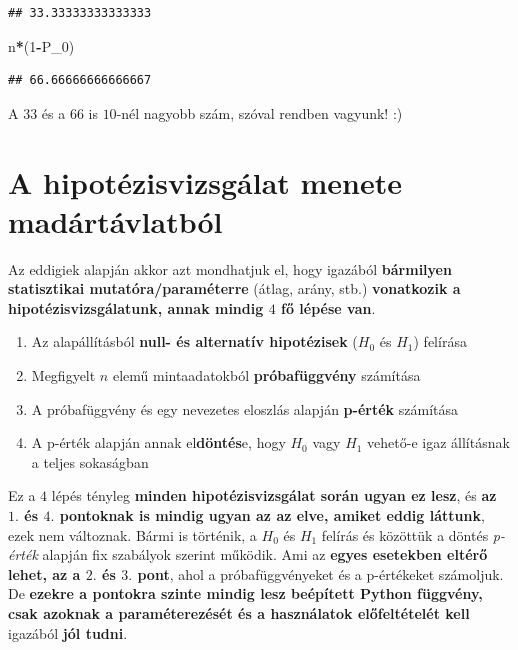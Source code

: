 \documentclass[
]{book}
\newenvironment{Shaded}{\begin{snugshade}}{\end{snugshade}}
\newcommand{\DecValTok}[1]{\textcolor[rgb]{0.00,0.00,0.81}{#1}}
\newcommand{\NormalTok}[1]{#1}
\newcommand{\OperatorTok}[1]{\textcolor[rgb]{0.81,0.36,0.00}{\textbf{#1}}}
\providecommand{\tightlist}{%
  \setlength{\itemsep}{0pt}\setlength{\parskip}{0pt}}
\begin{document}
\begin{verbatim}
## 33.33333333333333
\end{verbatim}

\begin{Shaded}
\begin{Highlighting}[]
\NormalTok{n}\OperatorTok{*}\NormalTok{(}\DecValTok{1}\OperatorTok{{-}}\NormalTok{P\_0)}
\end{Highlighting}
\end{Shaded}

\begin{verbatim}
## 66.66666666666667
\end{verbatim}

A \(33\) és a \(66\) is \(10\)-nél nagyobb szám, szóval rendben vagyunk! :)

\section{A hipotézisvizsgálat menete madártávlatból}\label{a-hipotuxe9zisvizsguxe1lat-menete-maduxe1rtuxe1vlatbuxf3l}

Az eddigiek alapján akkor azt mondhatjuk el, hogy igazából \textbf{bármilyen statisztikai mutatóra/paraméterre} (átlag, arány, stb.) \textbf{vonatkozik a hipotézisvizsgálatunk, annak mindig \(4\) fő lépése van}.

\begin{enumerate}
\def\labelenumi{\arabic{enumi}.}
\tightlist
\item
  Az alapállításból \textbf{null- és alternatív hipotézisek} (\(H_0\) és \(H_1\)) felírása
\item
  Megfigyelt \(n\) elemű mintaadatokból \textbf{próbafüggvény} számítása
\item
  A próbafüggvény és egy nevezetes eloszlás alapján \textbf{p-érték} számítása
\item
  A p-érték alapján annak el\textbf{döntés}e, hogy \(H_0\) vagy \(H_1\) vehető-e igaz állításnak a teljes sokaságban
\end{enumerate}

Ez a \(4\) lépés tényleg \textbf{minden hipotézisvizsgálat során ugyan ez lesz}, és \textbf{az \(1.\) és \(4.\) pontoknak is mindig ugyan az az elve, amiket eddig láttunk}, ezek nem változnak. Bármi is történik, a \(H_0\) és \(H_1\) felírás és közöttük a döntés \emph{p-érték} alapján fix szabályok szerint működik. Ami az \textbf{egyes esetekben eltérő lehet, az a \(2.\) és \(3.\) pont}, ahol a próbafüggvényeket és a p-értékeket számoljuk. De \textbf{ezekre a pontokra szinte mindig lesz beépített Python függvény, csak azoknak a paraméterezését és a használatok előfeltételét kell} igazából \textbf{jól tudni}.
\end{document}

